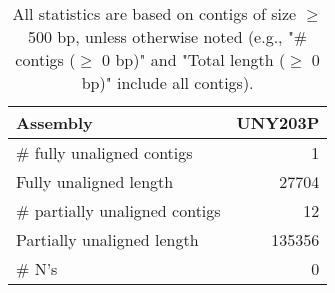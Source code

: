 \documentclass[12pt,a4paper]{article}
\begin{document}
\begin{table}[ht]
\begin{center}
\caption{All statistics are based on contigs of size $\geq$ 500 bp, unless otherwise noted (e.g., "\# contigs ($\geq$ 0 bp)" and "Total length ($\geq$ 0 bp)" include all contigs).}
\begin{tabular}{|l*{1}{|r}|}
\hline
Assembly & UNY203P \\ \hline
\# fully unaligned contigs & 1 \\ \hline
Fully unaligned length & 27704 \\ \hline
\# partially unaligned contigs & 12 \\ \hline
Partially unaligned length & 135356 \\ \hline
\# N's & 0 \\ \hline
\end{tabular}
\end{center}
\end{table}
\end{document}
